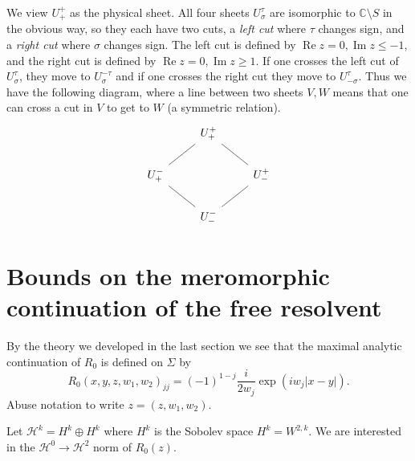 \documentclass[12pt]{report}
\newcommand{\CC}{\mathbb{C}}
\renewcommand{\Re}{\operatorname{Re}}
\renewcommand{\Im}{\operatorname{Im}}
\theoremstyle{definition}
\begin{document}
We view $U_+^+$ as the physical sheet. All four sheets $U_\sigma^\tau$ are isomorphic to $\CC \setminus S$ in the obvious way, so they each have two cuts, a \emph{left cut} where $\tau$ changes sign, and a \emph{right cut} where $\sigma$ changes sign.
The left cut is defined by $\Re z = 0, \Im z \leq -1$, and the right cut is defined by $\Re z = 0, \Im z \geq 1$.
If one crosses the left cut of $U_\sigma^\tau$, they move to $U_\sigma^{-\tau}$ and if one crosses the right cut they move to $U_{-\sigma}^\tau$.
Thus we have the following diagram, where a line between two sheets $V,W$ means that one can cross a cut in $V$ to get to $W$ (a symmetric relation).
$$\begin{tikzcd}
&U_+^+ \arrow[dash,dl] \arrow[dash,dr]\\
U_+^- \arrow[dash,dr] && U_-^+ \arrow[dash,dl]\\
&U_-^-
\end{tikzcd}$$



\section{Bounds on the meromorphic continuation of the free resolvent}
By the theory we developed in the last section we see that the maximal analytic continuation of $R_0$ is defined on $\Sigma$ by
$$R_0(x, y, z, w_1, w_2)_{jj} = (-1)^{1-j}\frac{i}{2w_j}\exp(iw_j|x-y|).$$
Abuse notation to write $z = (z, w_1, w_2)$.

Let $\mathcal H^k = H^k \oplus H^k$ where $H^k$ is the Sobolev space $H^k = W^{2,k}$.
We are interested in the $\mathcal H^0 \to \mathcal H^2$ norm of $R_0(z)$.
\end{document}
